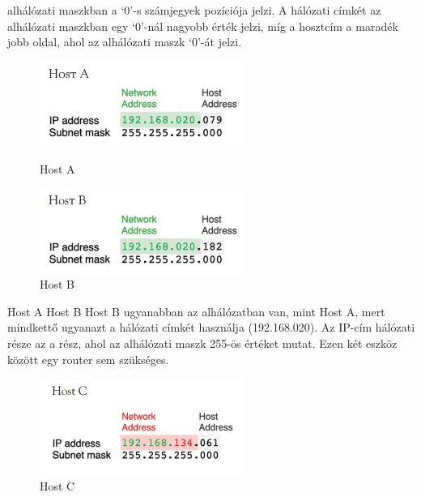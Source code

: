 alhálózati maszkban a `0'-s számjegyek pozíciója jelzi.
A hálózati címkét az alhálózati maszkban egy `0'-nál nagyobb érték jelzi,
míg a hosztcím a maradék jobb oldal, ahol az alhálózati maszk `0'-át jelzi.
\begin{figure}[H]
    \centering
    \begin{minipage}{0.45\textwidth}
        \centering
        \includegraphics[width=67mm, keepaspectratio]{figures/host_a.png}
        \caption{Host A}
    \end{minipage}\hfill
    \begin{minipage}{0.45\textwidth}
        \centering
        \includegraphics[width=67mm, keepaspectratio]{figures/host_b.png}
        \caption{Host B}
    \end{minipage}
\end{figure}
Host A Host B  Host B ugyanabban az alhálózatban van,
mint Host A, mert mindkettő ugyanazt a hálózati címkét használja (192.168.020).
Az IP-cím hálózati része az a rész, ahol az alhálózati maszk 255-ös értéket
mutat. Ezen két eszköz között egy router sem szükséges. 
\begin{figure}[H]
	\centering
	\includegraphics[width=67mm, keepaspectratio]{figures/host_c.png}
	\caption{Host C}
	\label {fig:host_c}
\end{figure}
